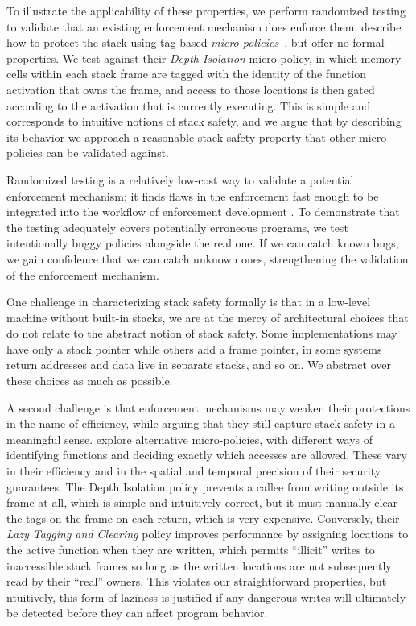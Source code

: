 \documentclass[acmsmall,review,anonymous]{acmart}\settopmatter{printfolios=true,printccs=false,printacmref=false}
\begin{document}
To illustrate the applicability of these properties, we perform randomized testing to
validate that an existing enforcement mechanism does enforce them.
\citet{DBLP:conf/sp/RoesslerD18} describe how to protect the stack
using tag-based \emph{micro-policies}~\citep{pump_oakland2015}, but offer no formal properties.
We test against their {\em Depth Isolation} micro-policy, in which memory cells within each stack
frame are tagged with the identity of the function activation
that owns the frame, and access to those locations is then gated
according to the activation that is currently executing. This is simple and corresponds
to intuitive notions of stack safety, and we argue that by describing its behavior
we approach a reasonable stack-safety property that other micro-policies can be
validated against.

Randomized testing is a relatively low-cost way to validate a potential enforcement
mechanism; it finds flaws in the enforcement fast enough to be integrated into the workflow
of enforcement development \citep{TestingNI:ICFP}. To demonstrate that the testing adequately
covers potentially erroneous programs, we test intentionally buggy policies alongside
the real one. If we can catch known bugs, we gain confidence that we can catch unknown ones,
strengthening the validation of the enforcement mechanism.

One challenge in characterizing stack safety formally is that in a low-level machine
without built-in stacks, we are at the mercy of architectural
choices that do not relate to the abstract notion of stack safety. Some implementations
may have only a stack pointer while others add a frame pointer, in some systems return
addresses and data live in separate stacks, and so on. We abstract over these choices
as much as possible.

A second challenge is that enforcement mechanisms may weaken their protections
in the name of efficiency, while arguing that they still capture stack safety in a meaningful sense.
\citet{DBLP:conf/sp/RoesslerD18} explore alternative micro-policies, with different
ways of identifying functions and deciding exactly which accesses are allowed.
These vary in their efficiency and in the spatial and temporal precision of their
security guarantees.
The Depth Isolation policy prevents a callee from writing outside its frame
at all, which is simple and intuitively correct, but it must manually clear the tags
on the frame on each return, which is very expensive. Conversely, their
\emph{Lazy Tagging and Clearing} policy improves
performance by assigning locations to the active function when they are written, which
permits  ``illicit'' writes to inaccessible stack frames so long as the
written locations are not subsequently read by their ``real'' owners. This violates our
straightforward properties, but ntuitively,
this form of laziness is justified if any dangerous writes will
ultimately be detected before they can affect program behavior.
\end{document}
